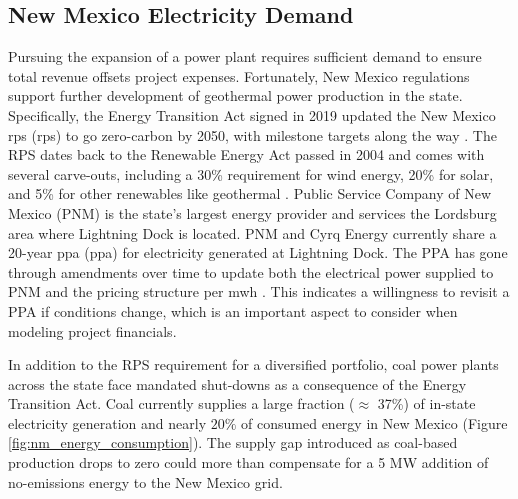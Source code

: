 \subsection{New Mexico Electricity Demand}\label{ch4:nm_rps}

Pursuing the expansion of a power plant requires sufficient demand to ensure total revenue offsets project expenses. Fortunately, New Mexico regulations support further development of geothermal power production in the state. Specifically, the Energy Transition Act signed in 2019 updated the New Mexico \acrlong{rps} (\acrshort{rps}) to go zero-carbon by 2050, with milestone targets along the way \citep{lillian_new_2019}. The RPS dates back to the Renewable Energy Act passed in 2004 and comes with several carve-outs, including a 30\% requirement for wind energy, 20\% for solar, and 5\% for other renewables like geothermal \citep{dsire_dsire_2021}. Public Service Company of New Mexico (PNM) is the state’s largest energy provider and services the Lordsburg area where Lightning Dock is located. PNM and Cyrq Energy currently share a 20-year \acrlong{ppa} (\acrshort{ppa}) for electricity generated at Lightning Dock. The PPA has gone through amendments over time to update both the electrical power supplied to PNM and the pricing structure per \acrshort{mwh} \citep[e.g.,][]{pnm_public_2014,stanfield_new_2017}. This indicates a willingness to revisit a PPA if conditions change, which is an important aspect to consider when modeling project financials.

In addition to the RPS requirement for a diversified portfolio, coal power plants across the state face mandated shut-downs as a consequence of the Energy Transition Act. Coal currently supplies a large fraction ($\approx$ 37\%) of in-state electricity generation \citep{eia_new_2021} and nearly $20\%$ of consumed energy in New Mexico (Figure \ref{fig:nm_energy_consumption}). The supply gap introduced as coal-based production drops to zero could more than compensate for a 5 MW addition of no-emissions energy to the New Mexico grid.

